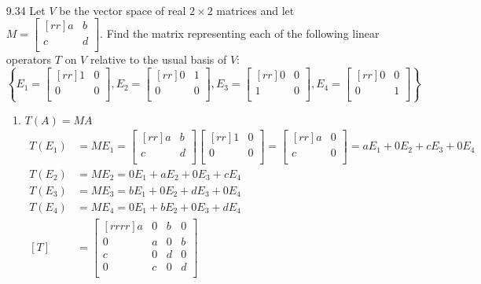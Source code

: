 \documentclass[12pt]{article}
\theoremstyle{definition}
\theoremstyle{plain}
\begin{document}
\begin{enumerate}
\begin{enumerate}
\begin{align*}
		\end{align*}
	\end{enumerate}
\item[9.34]Let $V$ be the vector space of real $2\times2$ matrices and let $M=\begin{bmatrix}[rr]a&b\\c&d\\\end{bmatrix}$. Find the matrix representing each of the following linear operators $T$ on $V$ relative to the usual basis of $V$:
\[ \left\{ E_1=\begin{bmatrix}[rr]1&0\\0&0\\\end{bmatrix}, E_2=\begin{bmatrix}[rr]0&1\\0&0\\\end{bmatrix}, E_3=\begin{bmatrix}[rr]0&0\\1&0\\\end{bmatrix},E_4=\begin{bmatrix}[rr]0&0\\0&1\\\end{bmatrix} \right\} \]
	\begin{enumerate}
	\item $T(A)=MA$
		\begin{align*}
		T(E_1)&=ME_1 = \begin{bmatrix}[rr]a&b\\c&d\\\end{bmatrix}\begin{bmatrix}[rr]1&0\\0&0\\\end{bmatrix} = \begin{bmatrix}[rr]a&0\\c&0\\\end{bmatrix} = aE_1+0E_2+cE_3+0E_4\\
		T(E_2)&=ME_2 = 0E_1+aE_2+0E_3+cE_4\\
		T(E_3)&=ME_3 = bE_1+0E_2+dE_3+0E_4\\
		T(E_4)&=ME_4 = 0E_1+bE_2+0E_3+dE_4\\
		[T]&= \begin{bmatrix}[rrrr]a&0&b&0\\0&a&0&b\\c&0&d&0\\0&c&0&d\\\end{bmatrix}

\end{align*}
\end{enumerate}
\end{enumerate}
\end{document}
